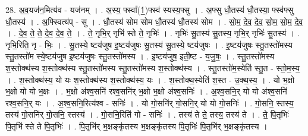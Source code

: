 \documentclass[17pt]{extarticle}
\begin{document}
28. अ॒व॒यज॑न॒मित्य॑व - यज॑नम् । . अ॒स्य॒ फ्स्वा᳚(1॒)फ्स्व॑ स्यस्य॒फ्सु । . अ॒फ्सु धौ॒तस्य॑ धौ॒तस्या॒ फ्स्व॑फ्सु धौ॒तस्य॑ । . अ॒फ्स्वित्य॑प् - सु । . धौ॒तस्य॑ सोम सोम धौ॒तस्य॑ धौ॒तस्य॑ सोम । . सो॒म॒ दे॒व॒ दे॒व॒ सो॒म॒ सो॒म॒ दे॒व॒ । . दे॒व॒ ते॒ ते॒ दे॒व॒ दे॒व॒ ते॒ । . ते॒ नृभि॒र् नृभि॑ स्ते ते॒ नृभिः॑ । . नृभिः॑ सु॒तस्य॑ सु॒तस्य॒ नृभि॒र् नृभिः॑ सु॒तस्य॑ । . नृभि॒रिति॒ नृ - भिः॒ । . सु॒तस्ये॒ ष्टय॑जुष इ॒ष्टय॑जुषः सु॒तस्य॑ सु॒तस्ये॒ ष्टय॑जुषः । . इ॒ष्टय॑जुषः स्तु॒तस्तो॑मस्य स्तु॒तस्तो॑म स्ये॒ष्टय॑जुष इ॒ष्टय॑जुषः स्तु॒तस्तो॑मस्य । . इ॒ष्टय॑जुष॒ इती॒ष्ट - य॒जु॒षः॒ । . स्तु॒तस्तो॑मस्य श॒स्तोक्थ॑स्य श॒स्तोक्थ॑स्य स्तु॒तस्तो॑मस्य स्तु॒तस्तो॑मस्य श॒स्तोक्थ॑स्य । . स्तु॒तस्तो॑म॒स्येति॑ स्तु॒त - स्तो॒म॒स्य॒ । . श॒स्तोक्थ॑स्य॒ यो यः श॒स्तोक्थ॑स्य श॒स्तोक्थ॑स्य॒ यः । . श॒स्तोक्थ॒स्येति॑ श॒स्त - उ॒क्थ॒स्य॒ । . यो भ॒क्षो भ॒क्षो यो यो भ॒क्षः । . भ॒क्षो अ॑श्व॒सनि॑ रश्व॒सनि॑र् भ॒क्षो भ॒क्षो अ॑श्व॒सनिः॑ । . अ॒श्व॒सनि॒र् यो यो अ॑श्व॒सनि॑ रश्व॒सनि॒र् यः । . अ॒श्व॒सनि॒रित्य॑श्व - सनिः॑ । . यो गो॒सनि॑र् गो॒सनि॒र् यो यो गो॒सनिः॑ । . गो॒सनि॒ स्तस्य॒ तस्य॑ गो॒सनि॑र् गो॒सनि॒ स्तस्य॑ । . गो॒सनि॒रिति॑ गो - सनिः॑ । . तस्य॑ ते ते॒ तस्य॒ तस्य॑ ते । . ते॒ पि॒तृभिः॑ पि॒तृभि॑ स्ते ते पि॒तृभिः॑ । . पि॒तृभि॑र् भ॒क्षङ्‍कृ॑तस्य भ॒क्षङ्‍कृ॑तस्य पि॒तृभिः॑ पि॒तृभि॑र् भ॒क्षङ्‍कृ॑तस्य । \newline
\end{document}
